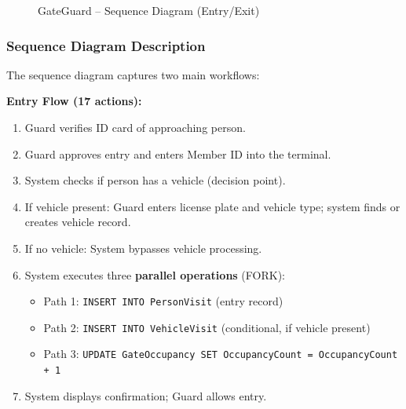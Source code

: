 \documentclass[a4paper, 12pt]{article}
\begin{document}
\begin{figure}[H]
    \centering
    \mbox{}
    \caption{GateGuard -- Sequence Diagram (Entry/Exit)}
    \label{fig:sequence}
\end{figure}

\newpage
\mbox{}
\newpage
\mbox{}
\newpage


\subsubsection{Sequence Diagram Description}

The sequence diagram captures two main workflows:

\textbf{Entry Flow (17 actions):}
\begin{enumerate}[leftmargin=*, nosep]
    \item Guard verifies ID card of approaching person.
    \item Guard approves entry and enters Member ID into the terminal.
    \item System checks if person has a vehicle (decision point).
    \item If vehicle present: Guard enters license plate and vehicle type; system finds or creates vehicle record.
    \item If no vehicle: System bypasses vehicle processing.
    \item System executes three \textbf{parallel operations} (FORK):
    \begin{itemize}[nosep]
        \item Path 1: \texttt{INSERT INTO PersonVisit} (entry record)
        \item Path 2: \texttt{INSERT INTO VehicleVisit} (conditional, if vehicle present)
        \item Path 3: \texttt{UPDATE GateOccupancy SET OccupancyCount = OccupancyCount + 1}
    \end{itemize}
    \item System displays confirmation; Guard allows entry.
\end{enumerate}
\end{document}
